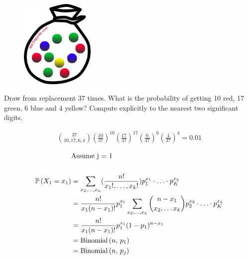 \documentclass[12pt]{article}
\begin{document}
\begin{enumerate}
{\begin{figure}[h]
\centering
\includegraphics[width=1.4in]{marbles.jpg}
\end{figure}

Draw from replacement 37 times. What is the probability of getting 10 red, 17 green, 6 blue and 4 yellow? Compute explicitly to the nearest two significant digits.}

\begin{align*}
    \binom{37}{10, 17, 6, 4} (\frac{10}{37})^{10} (\frac{17}{37})^{17} (\frac{6}{37})^6 (\frac{4}{37})^4 = 0.01
\end{align*}




\begin{align*}
    &\text{Assume j = 1} \\ \\
    \mathbb{P}\left(X_1=x_1\right) &= \sum_{x_2,\ldots, x_n} (\frac{n!}{x_1!, \ldots, x_k!}) p_1^{x_1}\cdot \ldots \cdot p_K^{x_k} \\
    &= \frac{n!}{x_1(n-x_1)!} p_1^{x_1} \sum_{x_2, \ldots, x_k} \binom{n-x_1}{x_2,\ldots x_k} p_2^{x_2}\cdot \ldots \cdot p_K^{x_k} \\
    &= \frac{n!}{x_1(n-x_1)!} p_1^{x_1} (1-p_1)^{n-x_1} \\
    &= \mathrm{Binomial}\left(n,\,p_1\right) \\
    &= \mathrm{Binomial}\left(n,\,p_j\right)
\end{align*}



\end{enumerate}
\end{document}
